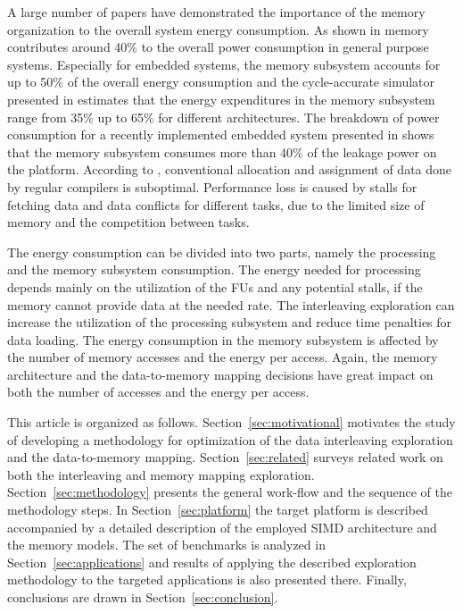 \documentclass[prodmode,acmtecs]{acmsmall}
\begin{document}
A large number of papers have demonstrated the importance of the memory organization to the overall system energy consumption. 
As shown in \cite{Gonzalez1996} memory contributes around 40\% to the overall power consumption in general purpose systems. 
Especially for embedded systems, the memory subsystem accounts for up to 50\% of the overall energy consumption \cite{Che09} and the cycle-accurate simulator presented in \cite{Ben99} estimates that the energy expenditures in the memory subsystem range from 35\% up to 65\% for different architectures. 
The breakdown of power consumption for a recently implemented embedded system presented in \cite{Hul11} shows that the memory subsystem consumes more than 40\% of the leakage power on the platform. 
According to \cite{tcm}, conventional allocation and assignment of data done by regular compilers is suboptimal. 
Performance loss is caused by stalls for fetching data and data conflicts for different tasks, due to the limited size of memory and the competition between tasks. 

The energy consumption can be divided into two parts, namely the processing and the memory subsystem consumption.  
The energy needed for processing depends mainly on the utilization of the FUs and any potential stalls, if the memory cannot provide data at the needed rate.
The interleaving exploration can increase the utilization of the processing subsystem and reduce time penalties for data loading.   
The energy consumption in the memory subsystem is affected by the number of memory accesses and the energy per access. 
Again, the memory architecture and the data-to-memory mapping decisions have great impact on both the number of accesses and the energy per access.

This article is organized as follows. 
Section~\ref{sec:motivational} motivates the study of developing a methodology for optimization of the data interleaving exploration and the data-to-memory mapping. 
Section~\ref{sec:related} surveys related work on both the interleaving and memory mapping exploration.
Section~\ref{sec:methodology} presents the general work-flow and the sequence of the methodology steps.
In Section~\ref{sec:platform} the target platform is described accompanied by a detailed description of the employed SIMD architecture and the memory models.
The set of benchmarks is analyzed in Section~\ref{sec:applications} and  
results of applying the described exploration methodology to the targeted applications is also presented there. Finally, conclusions are drawn in Section~\ref{sec:conclusion}. 
\end{document}
